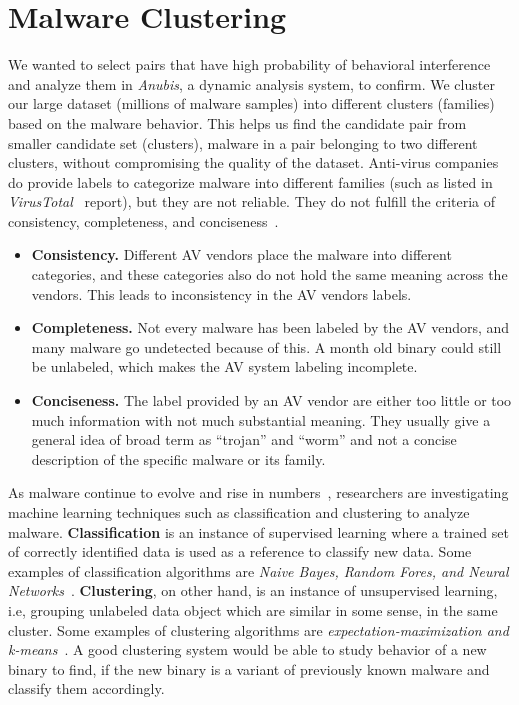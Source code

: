 \section{Malware Clustering}
\label{sec:Malware Clustering}
We wanted to select pairs that have high probability of behavioral interference and analyze them in \emph{Anubis}, a dynamic analysis system, to confirm.
We cluster our large dataset (millions of malware samples) into different clusters (families) based on the malware behavior.
This helps us find the candidate pair from smaller candidate set (clusters), malware in a pair belonging to two different clusters, without compromising the quality of the dataset.
Anti-virus companies do provide labels to categorize malware into different families (such as listed in \emph{VirusTotal}~\cite[]{virustotal} report), but they are not reliable.
They do not fulfill the criteria of consistency, completeness, and conciseness~\cite[]{bailey}.\\
\begin{itemize}
\item \textbf{Consistency.} Different AV vendors place the malware into different categories, and these categories also do not hold the same meaning across the vendors.
This leads to inconsistency in the AV vendors labels.
\item \textbf{Completeness.} Not every malware has been labeled by the AV vendors, and many malware go undetected because of this.
A month old binary could still be unlabeled, which makes the AV system labeling incomplete.
\item \textbf{Conciseness.} The label provided by an AV vendor are either too little or too much information with not much substantial meaning.
They usually give a general idea of broad term as ``trojan'' and ``worm'' and not a concise description of the specific malware or its family.
\end{itemize}
As malware continue to evolve and rise in numbers~\cite[]{barecloud,avtest}, researchers are investigating machine learning techniques such as classification and clustering to analyze malware.
\textbf{Classification} is an instance of supervised learning where a trained set of correctly identified data is used as a reference to classify new data.
Some examples of classification algorithms are \emph{Naive Bayes, Random Fores, and Neural Networks}~\cite[]{classification}.
\textbf{Clustering}, on other hand, is an instance of unsupervised learning, i.e, grouping unlabeled data object which are similar in some sense, in the same cluster.
Some examples of clustering algorithms are \emph{expectation-maximization and k-means}~\cite[]{clustering}.
A good clustering system would be able to study behavior of a new binary to find, if the new binary is a variant of previously known malware and classify them accordingly.\\

